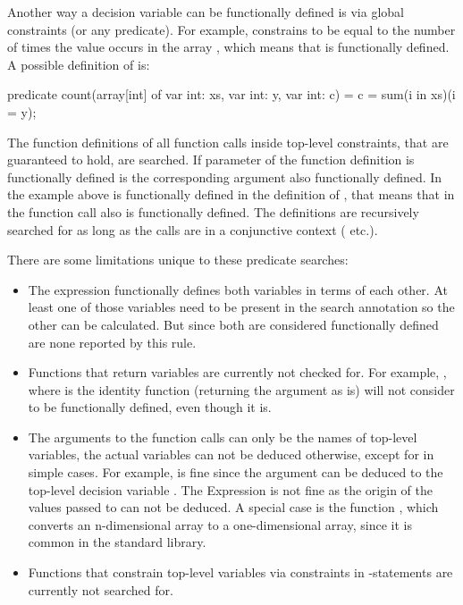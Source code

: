 \documentclass[a4paper,12pt]{article}
\begin{document}
Another way a decision variable can be functionally defined is via global constraints (or
any predicate). For example,  constrains  to be equal to the
number of times the value  occurs in the array , which means that  is
functionally defined. A possible definition of  is:
\begin{mznnobreak}
predicate count(array[int] of var int: xs,
                var int: y, var int: c) =
  c = sum(i in xs)(i = y);
\end{mznnobreak}

The function definitions of all function calls inside top-level constraints, that are
guaranteed to hold, are searched. If parameter of the function definition is functionally
defined is the corresponding argument also functionally defined. In the example above is
 functionally defined in the definition of , that means that  in the
function call  also is functionally defined. The definitions are
recursively searched for as long as the calls are in a conjunctive context (\mi{/\\}
etc.).

There are some limitations unique to these predicate searches:
\begin{itemize}
  \item The expression  functionally defines both variables in terms of each other.
  At least one of those variables need to be present in the search annotation so the other
  can be calculated. But since both are considered functionally defined are none reported
  by this rule.
  \item
  \begin{sloppypar}
  Functions that return variables are currently not checked for. For example, , where
   is the identity function (returning the argument as is) will not consider 
  to be functionally defined, even though it is.
  \end{sloppypar}
  \item The arguments to the function calls can only be the names of top-level variables,
  the actual variables can not be deduced otherwise, except for in simple cases. For
  example,  is fine since the argument can be deduced to the top-level decision
  variable . The Expression  is not fine as the origin of the
  values passed to  can not be deduced. A special case is the function ,
  which converts an n-dimensional array to a one-dimensional array, since it is common in
  the standard library.
  \item Functions that constrain top-level variables via constraints in
  -statements are currently not searched for.
\end{itemize}
\end{document}
